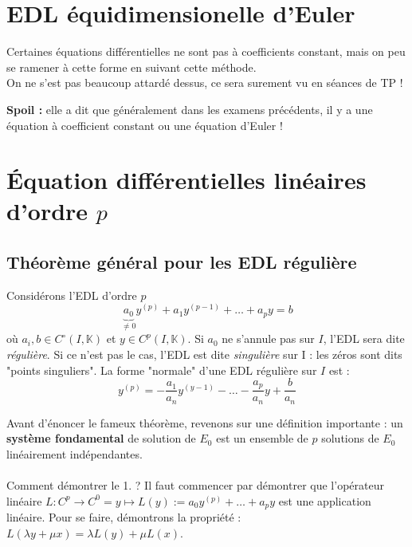 \documentclass[11pt, a4paper, openany]{book}
\begin{document}
	
\section{EDL équidimensionelle d'Euler}
Certaines équations différentielles ne sont pas à coefficients constant, mais on peu se ramener à cette forme en suivant cette méthode.\\
On ne s'est pas beaucoup attardé dessus, ce sera surement vu en séances de TP !
	
\textbf{Spoil :} elle a dit que généralement dans les examens précédents, il y a une équation à coefficient constant ou une équation d'Euler ! 
	
\setcounter{section}{6}
\section{Équation différentielles linéaires d'ordre $p$}
\subsection{Théorème général pour les EDL régulière}
Considérons l'EDL d'ordre $p$
\begin{equation}
	\underbrace{a_0}_{\neq 0} y^{(p)} + a_1y^{(p-1)} + \dots + a_py = b
\end{equation}
où $a_i, b \in C^\circ(I, \mathbb{K})$ et $y \in C^p(I, \mathbb{K})$. Si $a_0$ ne s'annule pas sur $I$, l'EDL sera dite \textit{régulière}. Si ce n'est pas le cas, l'EDL est dite \textit{singulière} sur I : les zéros sont dits "points singuliers".
La forme "normale" d'une EDL régulière sur $I$ est :
\begin{equation}
	y^{(p)} = -\frac{a_1}{a_n}y^{(y-1)} - \dots - \frac{a_p}{a_n}y + \frac{b}{a_n}
\end{equation}
	
Avant d'énoncer le fameux théorème, revenons sur une définition importante : un \textbf{système fondamental} de solution de $E_0$ est un ensemble de $p$ solutions de $E_0$ linéairement indépendantes.\\
	
\ \\
Comment démontrer le 1. ? Il faut commencer par démontrer que l'opérateur linéaire $L : C^p \rightarrow C^0 = y \mapsto L(y) := a_0y^{(p)} + \dots + a_p y$ est une application linéaire. Pour se faire, démontrons la propriété : $L(\lambda y + \mu x) = \lambda L(y) + \mu L(x)$.
		
\end{document}
